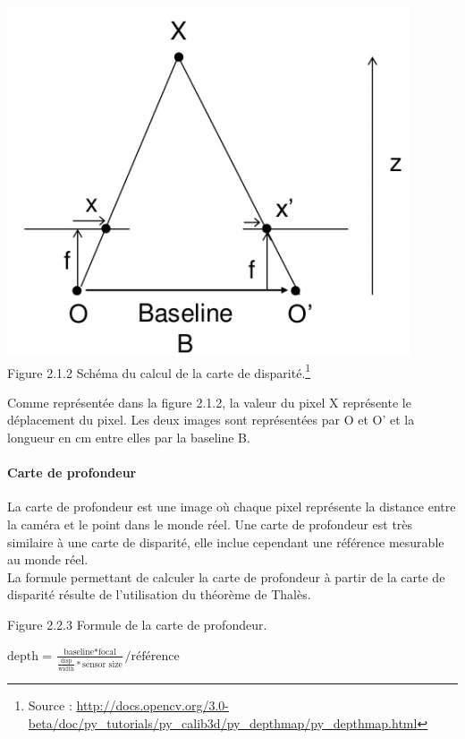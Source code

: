 \documentclass[12pt,a4paper]{report}
\begin{document}
\begin{center}
	\includegraphics[scale=0.5]{disparity.jpg}\\
	Figure 2.1.2 Schéma du calcul de la carte de disparité.\footnote{Source : \url{http://docs.opencv.org/3.0-beta/doc/py_tutorials/py_calib3d/py_depthmap/py_depthmap.html}}\\
\end{center}

Comme représentée dans la figure 2.1.2, la valeur du pixel X représente le déplacement du pixel.
Les deux images sont représentées par O et O' et la longueur en cm entre elles par la baseline B.
\paragraph{Carte de profondeur}
La carte de profondeur est une image où chaque pixel représente la distance entre la caméra et le point dans le monde réel. Une carte de profondeur est très similaire à une carte de disparité, elle inclue cependant une référence mesurable au monde réel.\\
La formule permettant de calculer la carte de profondeur à partir de la carte de disparité résulte de l'utilisation du théorème de Thalès.\\

\begin{center}
Figure 2.2.3 Formule de la carte de profondeur.\\

\begin{huge}
$\text{depth} = \frac{\text{baseline} * \text{focal}}{\frac{\text{disp}}{\text{width}} * \text{sensor size}} / \text{référence}$\\
\end{huge}
\end{center}
\end{document}
